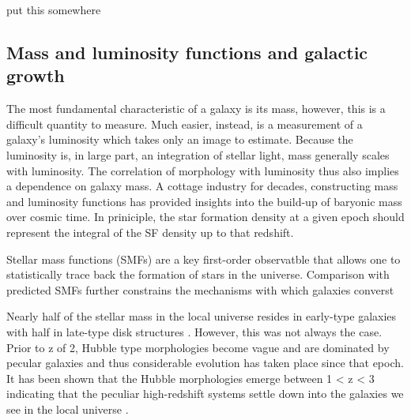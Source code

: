 put this somewhere \citep{Mei2009}



\subsection{Mass and luminosity functions and galactic growth}
The most fundamental characteristic of a galaxy is its mass, however, this is a difficult quantity to measure. Much easier, instead, is a measurement of a galaxy's luminosity which takes only an image to estimate. Because the luminosity is, in large part, an integration of stellar light, mass generally scales with luminosity. The correlation of morphology with luminosity thus also implies a dependence on galaxy mass. A cottage industry for decades, constructing mass and luminosity functions has provided insights into the build-up of baryonic mass over cosmic time. 
In priniciple, the star formation density at a given epoch should represent the integral of the SF density up to that redshift. 

Stellar mass functions (SMFs) are a key first-order observatble that allows one to statistically trace back the formation of stars in the universe. Comparison with predicted SMFs further constrains the mechanisms with which galaxies converst 

Nearly half of the stellar mass in the local universe resides in early-type galaxies with half in late-type disk structures \citep{Kelvin2014}. However, this was not always the case.  Prior to z of 2, Hubble type morphologies become vague and are dominated by pecular galaxies \citep{Dickenson2000,Papovich2005,Cameron2011,Conselice2005,Conselice2011,Buitrago2013}and thus considerable evolution has taken place since that epoch. It has been shown that the Hubble morphologies emerge between 1 < z < 3 indicating that the peculiar high-redshift systems settle down into the galaxies we see in the local universe \citep{Mortlock2013}. 

